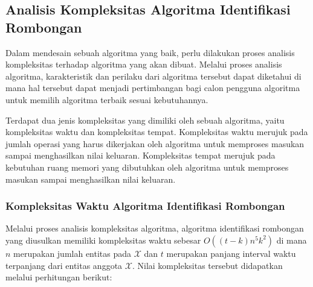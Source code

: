 \subsection{Analisis Kompleksitas Algoritma Identifikasi Rombongan}
\label{subsec:complexity}

Dalam mendesain sebuah algoritma yang baik, perlu dilakukan proses analisis kompleksitas terhadap algoritma yang akan dibuat. Melalui proses analisis algoritma, karakteristik dan perilaku dari algoritma tersebut dapat diketahui di mana hal tersebut dapat menjadi pertimbangan bagi calon pengguna algoritma untuk memilih algoritma terbaik sesuai kebutuhannya.

Terdapat dua jenis kompleksitas yang dimiliki oleh sebuah algoritma, yaitu kompleksitas waktu dan kompleksitas tempat. Kompleksitas waktu merujuk pada jumlah operasi yang harus dikerjakan oleh algoritma untuk memproses masukan sampai menghasilkan nilai keluaran. Kompleksitas tempat merujuk pada kebutuhan ruang memori yang dibutuhkan oleh algoritma untuk memproses masukan sampai menghasilkan nilai keluaran.

\subsubsection{Kompleksitas Waktu Algoritma Identifikasi Rombongan}
\label{subsubsec:time-complexity}

Melalui proses analisis kompleksitas algoritma, algoritma identifikasi rombongan yang diusulkan memiliki kompleksitas waktu sebesar $O((t - k)n^5k^2)$ di mana $n$ merupakan jumlah entitas pada $\mathcal{X}$ dan $t$ merupakan panjang interval waktu terpanjang dari entitas anggota $\mathcal{X}$. Nilai kompleksitas tersebut didapatkan melalui perhitungan berikut:

